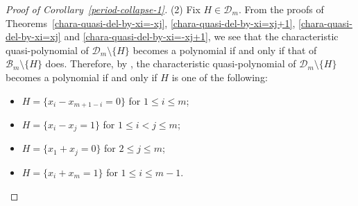 \documentclass{article}
\theoremstyle{plain}
\theoremstyle{definition}
\theoremstyle{remark}
\numberwithin{equation}{section}
\newcommand{\Bc}{\mathcal{B}}
\newcommand{\Dc}{\mathcal{D}}
\begin{document}
\begin{proof}[Proof of Corollary~\ref{period-collapse-1}]
\noindent
(2) Fix $H \in \Dc_m$. From the proofs of Theorems~\ref{chara-quasi-del-by-xi=-xj}, \ref{chara-quasi-del-by-xi=xj+1}, \ref{chara-quasi-del-by-xi=xj} and \ref{chara-quasi-del-by-xi=-xj+1}, we see that the characteristic quasi-polynomial of $\Dc_m \setminus \{H\}$ becomes a polynomial if and only if that of $\Bc_m \setminus \{H\}$ does. Therefore, by \cite[Corollary 1.4]{HN2024}, the characteristic quasi-polynomial of $\Dc_m \setminus \{H\}$ becomes a polynomial if and only if $H$ is one of the following:
\begin{itemize}
    \item $H=\{x_i-x_{m+1-i}=0\}$ for $1 \leq i \leq m$;
    \item $H=\{x_i-x_j=1\}$ for $1 \leq i<j \leq m$; 
    \item $H=\{x_1+x_j=0\}$ for $2 \leq j \leq m$; 
    \item $H=\{x_i+x_m=1\}$ for $1 \leq i \leq m-1$.  
\end{itemize}
\end{proof}
\end{document}
